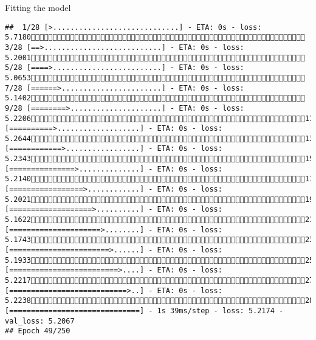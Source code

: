 \documentclass[
  ignorenonframetext,
]{beamer}
\begin{document}
\begin{frame}[fragile]{Fitting the model}
\begin{verbatim}
##  1/28 [>.............................] - ETA: 0s - loss: 5.7180 3/28 [==>...........................] - ETA: 0s - loss: 5.2001 5/28 [====>.........................] - ETA: 0s - loss: 5.0653 7/28 [======>.......................] - ETA: 0s - loss: 5.1402 9/28 [========>.....................] - ETA: 0s - loss: 5.220611/28 [==========>...................] - ETA: 0s - loss: 5.264413/28 [============>.................] - ETA: 0s - loss: 5.234315/28 [===============>..............] - ETA: 0s - loss: 5.214017/28 [=================>............] - ETA: 0s - loss: 5.202119/28 [===================>..........] - ETA: 0s - loss: 5.162221/28 [=====================>........] - ETA: 0s - loss: 5.174323/28 [=======================>......] - ETA: 0s - loss: 5.193325/28 [=========================>....] - ETA: 0s - loss: 5.221727/28 [===========================>..] - ETA: 0s - loss: 5.223828/28 [==============================] - 1s 39ms/step - loss: 5.2174 - val_loss: 5.2067
## Epoch 49/250

\end{verbatim}
\end{frame}
\end{document}
